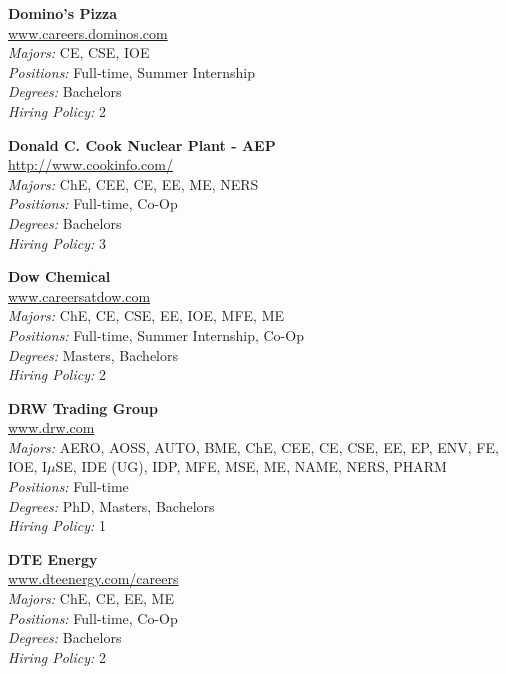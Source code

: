 \documentclass[twoside]{article}
\begin{document}
\begin{center}
\begin{multicols}{3}
\begin{minipage}{.9\columnwidth}{\Large\bf Domino's Pizza }\\
	\url{www.careers.dominos.com}\\
	\emph{Majors:} CE, CSE, IOE\\
	\emph{Positions:} Full-time, Summer Internship\\
	\emph{Degrees:} Bachelors\\
	\emph{Hiring Policy:} 2\\
\end{minipage}
 
\begin{minipage}{.9\columnwidth}{\Large\bf Donald C. Cook Nuclear Plant - AEP }\\
	\url{http://www.cookinfo.com/}\\
	\emph{Majors:} ChE, CEE, CE, EE, ME, NERS\\
	\emph{Positions:} Full-time, Co-Op\\
	\emph{Degrees:} Bachelors\\
	\emph{Hiring Policy:} 3\\
\end{minipage}
 
\begin{minipage}{.9\columnwidth}{\Large\bf Dow Chemical }\\
	\url{www.careersatdow.com}\\
	\emph{Majors:} ChE, CE, CSE, EE, IOE, MFE, ME\\
	\emph{Positions:} Full-time, Summer Internship, Co-Op\\
	\emph{Degrees:} Masters, Bachelors\\
	\emph{Hiring Policy:} 2\\
\end{minipage}
 
\begin{minipage}{.9\columnwidth}{\Large\bf DRW Trading Group }\\
	\url{www.drw.com}\\
	\emph{Majors:} AERO, AOSS, AUTO, BME, ChE, CEE, CE, CSE, EE, EP, ENV, FE, IOE, I$\mu$SE, IDE (UG), IDP, MFE, MSE, ME, NAME, NERS, PHARM\\
	\emph{Positions:} Full-time\\
	\emph{Degrees:} PhD, Masters, Bachelors\\
	\emph{Hiring Policy:} 1\\
\end{minipage}
 
\begin{minipage}{.9\columnwidth}{\Large\bf DTE Energy }\\
	\url{www.dteenergy.com/careers}\\
	\emph{Majors:} ChE, CE, EE, ME\\
	\emph{Positions:} Full-time, Co-Op\\
	\emph{Degrees:} Bachelors\\
	\emph{Hiring Policy:} 2\\
\end{minipage}
 

\end{multicols}
\end{center}
\end{document}
